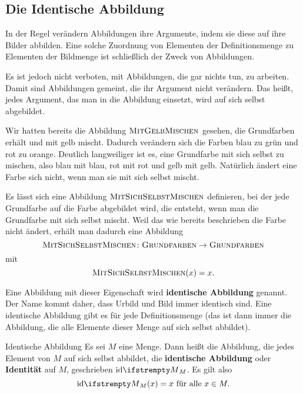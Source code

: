 \documentclass[../../main.tex]{subfiles}
\begin{document}
\subsection{Die Identische Abbildung}
\label{sec:abbildungen_identitaet}

In der Regel verändern Abbildungen ihre Argumente, indem sie diese auf ihre Bilder abbilden. Eine solche Zuordnung von Elementen der Definitionsmenge zu Elementen der Bildmenge ist schließlich der Zweck von Abbildungen. 

Es ist jedoch nicht verboten, mit Abbildungen, die gar nichts tun, zu arbeiten. Damit sind Abbildungen gemeint, die ihr Argument nicht verändern. Das heißt, jedes Argument, das man in die Abbildung einsetzt, wird auf sich selbst abgebildet.

\begin{example}{}
    \parpic[r]{}
    Wir hatten bereits die Abbildung $\textsc{MitGelbMischen}$ gesehen, die Grundfarben erhält und mit gelb mischt. Dadurch verändern sich die Farben blau zu grün und rot zu orange. Deutlich langweiliger ist es, eine Grundfarbe mit sich selbst zu mischen, also blau mit blau, rot mit rot und gelb mit gelb. Natürlich ändert eine Farbe sich nicht, wenn man sie mit sich selbst mischt.
    
    Es lässt sich eine Abbildung $\textsc{MitSichSelbstMischen}$ definieren, bei der jede Grundfarbe auf die Farbe abgebildet wird, die entsteht, wenn man die Grundfarbe mit sich selbst mischt. Weil das wie bereits beschrieben die Farbe nicht ändert, erhält man dadurch eine Abbildung
    \[\textsc{MitSichSelbstMischen}\colon\textsc{Grundfarben}\rightarrow\textsc{Grundfarben}\]
    mit
    \[\textsc{MitSichSelbstMischen}(x)=x.\]
\end{example}

Eine Abbildung mit dieser Eigenschaft wird \textbf{identische Abbildung} genannt. Der Name kommt daher, dass Urbild und Bild immer identisch sind. Eine identische Abbildung gibt es für jede Definitionsmenge (das ist dann immer die Abbildung, die alle Elemente dieser Menge auf sich selbst abbildet).

\begin{definition}{Identische Abbildung}
    Es sei $M$ eine Menge. Dann heißt die Abbildung, die jedes Element von $M$ auf sich selbst abbildet, die \textbf{identische Abbildung} oder \textbf{Identität} auf $M$, geschrieben $\ident[M]$. Es gilt also \[\ident[M](x)=x\text{~für alle~}x\in M.\]
\end{definition}
\end{document}
